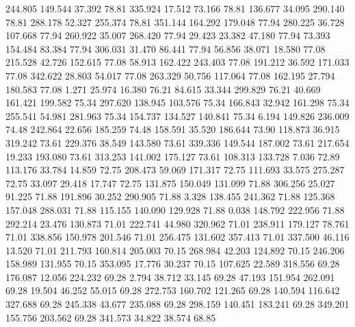  244.805  149.544   37.392        78.81
 335.924   17.512   73.166        78.81
 136.677   34.095  290.140        78.81
 288.178   52.327  255.374        78.81
 351.144  164.292  179.048        77.94
 280.225   36.728  107.668        77.94
 260.922   35.007  268.420        77.94
  29.423   23.382   47.180        77.94
  73.393  154.484   83.384        77.94
 306.031   31.470   86.441        77.94
  56.856   38.071   18.580        77.08
 215.528   42.726  152.615        77.08
  58.913  162.422  243.403        77.08
 191.212   36.592  171.033        77.08
 342.622   28.803   54.017        77.08
 263.329   50.756  117.064        77.08
 162.195   27.794  180.583        77.08
   1.271   25.974   16.380        76.21
  84.615   33.344  299.829        76.21
  40.669  161.421  199.582        75.34
 297.620  138.945  103.576        75.34
 166.843   32.942  161.298        75.34
 255.541   54.981  281.963        75.34
 154.737  134.527  140.841        75.34
   6.194  149.826  236.009        74.48
 242.864   22.656  185.259        74.48
 158.591   35.520  186.644        73.90
 118.873   36.915  319.242        73.61
 229.376   38.549  143.580        73.61
 339.336  149.544  187.002        73.61
 217.654   19.233  193.080        73.61
 313.253  141.002  175.127        73.61
 108.313  133.728    7.036        72.89
 113.176   33.784   14.859        72.75
 208.473   59.069  171.317        72.75
 111.693   33.575  275.287        72.75
  33.097   29.418   17.747        72.75
 131.875  150.049  131.099        71.88
 306.256   25.027   91.225        71.88
 191.896   30.252  290.905        71.88
   3.328  138.455  241.362        71.88
 125.368  157.048  288.031        71.88
 115.155  140.090  129.928        71.88
   0.038  148.792  222.956        71.88
 292.214   23.476  130.873        71.01
 222.741   44.980  320.962        71.01
 238.911  179.127   78.761        71.01
 338.856  150.978  201.546        71.01
 256.475  131.602  357.413        71.01
 337.500   46.116   13.520        71.01
 211.793  160.814  205.003        70.15
 268.984   42.203  124.892        70.15
 246.206  158.989  131.955        70.15
 353.095   17.776   30.237        70.15
 107.625   22.589  318.556        69.28
 176.087   12.056  224.232        69.28
   2.794   38.712   33.145        69.28
  47.193  151.954  262.091        69.28
  19.504   46.252   55.015        69.28
 272.753  160.702  121.265        69.28
 140.594  116.642  327.688        69.28
 245.338   43.677  235.088        69.28
 298.159  140.451  183.241        69.28
 349.201  155.756  203.562        69.28
 341.573   34.822   38.574        68.85
